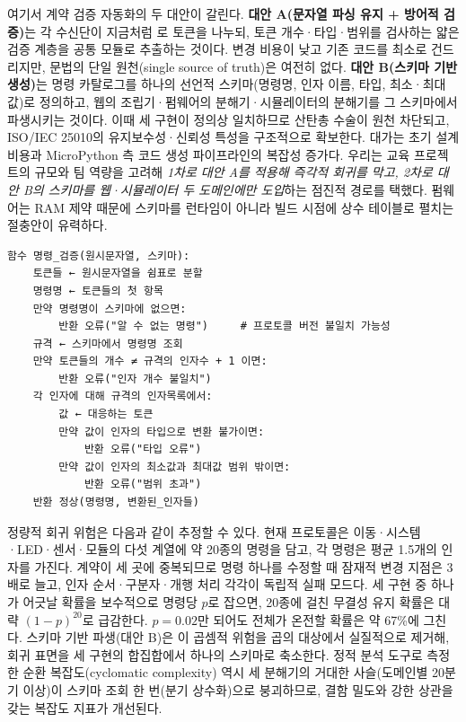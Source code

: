 여기서 계약 검증 자동화의 두 대안이 갈린다. \textbf{대안 A(문자열 파싱 유지 + 방어적 검증)}는 각 수신단이 지금처럼 로 토큰을 나누되, 토큰 개수·타입·범위를 검사하는 얇은 검증 계층을 공통 모듈로 추출하는 것이다. 변경 비용이 낮고 기존 코드를 최소로 건드리지만, 문법의 단일 원천(single source of truth)은 여전히 없다. \textbf{대안 B(스키마 기반 생성)}는 명령 카탈로그를 하나의 선언적 스키마(명령명, 인자 이름, 타입, 최소·최대값)로 정의하고, 웹의 조립기·펌웨어의 분해기·시뮬레이터의 분해기를 그 스키마에서 파생시키는 것이다. 이때 세 구현이 정의상 일치하므로 산탄총 수술이 원천 차단되고, ISO/IEC 25010의 유지보수성·신뢰성 특성\cite{iso25010}을 구조적으로 확보한다. 대가는 초기 설계 비용과 MicroPython 측 코드 생성 파이프라인의 복잡성 증가다. 우리는 교육 프로젝트의 규모와 팀 역량을 고려해 \emph{1차로 대안 A를 적용해 즉각적 회귀를 막고, 2차로 대안 B의 스키마를 웹·시뮬레이터 두 도메인에만 도입}하는 점진적 경로를 택했다. 펌웨어는 RAM 제약 때문에 스키마를 런타임이 아니라 빌드 시점에 상수 테이블로 펼치는 절충안이 유력하다.

\begin{verbatim}
함수 명령_검증(원시문자열, 스키마):
    토큰들 ← 원시문자열을 쉼표로 분할
    명령명 ← 토큰들의 첫 항목
    만약 명령명이 스키마에 없으면:
        반환 오류("알 수 없는 명령")     # 프로토콜 버전 불일치 가능성
    규격 ← 스키마에서 명령명 조회
    만약 토큰들의 개수 ≠ 규격의 인자수 + 1 이면:
        반환 오류("인자 개수 불일치")
    각 인자에 대해 규격의 인자목록에서:
        값 ← 대응하는 토큰
        만약 값이 인자의 타입으로 변환 불가이면:
            반환 오류("타입 오류")
        만약 값이 인자의 최소값과 최대값 범위 밖이면:
            반환 오류("범위 초과")
    반환 정상(명령명, 변환된_인자들)
\end{verbatim}

정량적 회귀 위험은 다음과 같이 추정할 수 있다. 현재 프로토콜은 이동·시스템·LED·센서·모듈의 다섯 계열에 약 20종의 명령을 담고, 각 명령은 평균 1.5개의 인자를 가진다. 계약이 세 곳에 중복되므로 명령 하나를 수정할 때 잠재적 변경 지점은 3배로 늘고, 인자 순서·구분자·개행 처리 각각이 독립적 실패 모드다. 세 구현 중 하나가 어긋날 확률을 보수적으로 명령당 $p$로 잡으면, 20종에 걸친 무결성 유지 확률은 대략 $(1-p)^{20}$로 급감한다. $p=0.02$만 되어도 전체가 온전할 확률은 약 67\%에 그친다. 스키마 기반 파생(대안 B)은 이 곱셈적 위험을 곱의 대상에서 실질적으로 제거해, 회귀 표면을 세 구현의 합집합에서 하나의 스키마로 축소한다. 정적 분석 도구로 측정한 순환 복잡도(cyclomatic complexity) 역시 세 분해기의 거대한  사슬(도메인별 20분기 이상)이 스키마 조회 한 번(분기 상수화)으로 붕괴하므로, 결함 밀도와 강한 상관을 갖는 복잡도 지표\cite{mcconnell2004codecomplete}가 개선된다.

